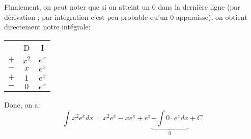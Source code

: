 \documentclass[a4paper]{article}
\begin{document}
{{        Finalement, on peut noter que si on atteint un 0 dans la dernière ligne (par dérivation ; par intégration c'est peu probable qu'un 0 apparaisse), on obtient directement notre intégrale:
        \begin{center}
        \begin{tabular}{ccc}
            & D & I  \\
            $+$ & $\displaystyle x^2$ & $\displaystyle e^x$  \\
            $-$ & $\displaystyle x$ & $\displaystyle e^x$  \\
            $+$ & $\displaystyle 1$ & $\displaystyle e^x$  \\
            $-$ & $\displaystyle 0$ & $\displaystyle e^x$
        \end{tabular}
        \end{center}

        Donc, on a:
        \[\int x^2 e^x dx = x^2 e^x - xe^x + e^x \underbrace{- \int0\cdot e^x dx}_{0} + C\]

    }
}
\end{document}
